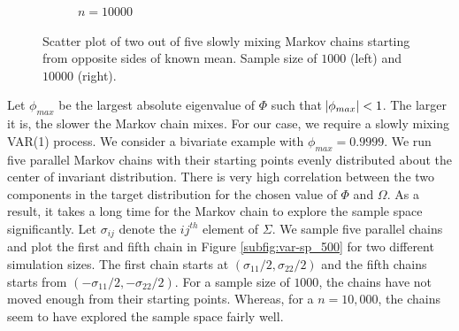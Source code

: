 \documentclass[11pt]{article}
\theoremstyle{remark}
\begin{document}
\begin{figure}[h]
\begin{subfigure}[h]{0.4\textwidth}
          \caption{$n = 10000$}
          \label{subfig:var-sp_10000}
      \end{subfigure}
     \caption{Scatter plot of two out of five slowly mixing Markov chains starting from opposite sides of known mean.  Sample size of $1000$ (left) and $10000$ (right).}
     \label{fig:var-sp}
 \end{figure}


Let $\phi_{max}$ be the largest absolute eigenvalue of $\Phi$ such that $\abs{\phi_{max}} < 1$. The larger it is, the slower the Markov chain mixes. For our case, we require a slowly mixing VAR(1) process. We consider a bivariate example with $\phi_{max} = 0.9999$. We run five parallel Markov chains with their starting points evenly distributed about the center of invariant distribution. There is very high correlation between the two components in the target distribution for the chosen value of $\Phi$ and $\Omega$. As a result, it takes a long time for the Markov chain to explore the sample space significantly. Let $\sigma_{ij}$ denote the $ij^{th}$ element of $\Sigma$. We sample five parallel chains and plot the first and fifth chain in Figure \ref{subfig:var-sp_500} for two different simulation sizes. The first chain starts at $(\sigma_{11}/2, \sigma_{22}/2)$ and the fifth chains starts from $(-\sigma_{11}/2, -\sigma_{22}/2)$. For a sample size of $1000$, the chains have not moved enough from their starting points. Whereas, for a $n = 10,000$, the chains seem to have explored the sample space fairly well.\\
\end{document}
